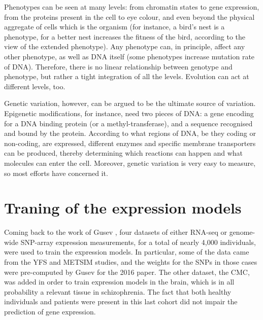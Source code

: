 \documentclass[../main.tex]{subfiles}
\begin{document}
Phenotypes can be seen at many levels: from chromatin states to gene 
expression, from the proteins present in the cell to eye colour, and 
even beyond the physical aggregate of cells which is the organism (for 
instance, a bird's nest is a phenotype, for a better nest increases the 
fitness of the bird, according to the view of the extended 
phenotype\autocite{Dawkins1999}). Any phenotype can, in principle, 
affect any other phenotype, as well as DNA itself (\eg some phenotypes 
increase mutation rate of DNA). Therefore, there is no linear 
relationship between genotype and phenotype, but rather a tight 
integration of all the levels. Evolution can act at different levels, 
too.

Genetic variation, however, can be argued to be the ultimate source of 
variation. Epigenetic modifications, for instance, need two pieces of 
DNA: a gene encoding for a DNA binding protein (or a 
methyl-transferase), and a sequence recognised and bound by the protein. 
According to what regions of DNA, be they coding or non-coding, are 
expressed, different enzymes and specific membrane transporters can be 
produced, thereby determining which reactions can happen and what 
molecules can enter the cell\autocite{Alberts2014}. Moreover, genetic 
variation is very easy to measure, so most efforts have concerned it.

\section{Traning of the expression models}

Coming back to the work of Gusev \etal, four datasets of either RNA-seq 
or genome-wide SNP-array expression measurements, for a total of nearly 
4,000 individuals,  were used to train the expression 
models. In particular, some 
of the data came from the YFS and METSIM studies, and the weights for 
the SNPs in those cases were pre-computed by Gusev \etal for the 2016 
paper. The other dataset, the CMC, was added in order to train 
expression models in the brain, which is in all probability a relevant 
tissue in schizophrenia. The fact that both healthy individuals and 
patients were present in this last cohort did not impair the prediction 
of gene expression.
\end{document}
